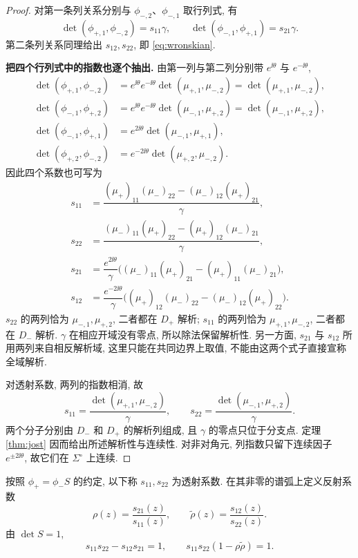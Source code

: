\begin{proof}
对第一条列关系分别与 $\phi_{-,2}$、$\phi_{-,1}$ 取行列式, 有
\[
\det(\phi_{+,1},\phi_{-,2})=s_{11}\gamma,\qquad
\det(\phi_{-,1},\phi_{+,1})=s_{21}\gamma.
\]
第二条列关系同理给出 $s_{12},s_{22}$, 即 \eqref{eq:wronskian}. 
\par\medskip\noindent\textbf{把四个行列式中的指数也逐个抽出.}\quad 
由第一列与第二列分别带 $e^{\ii\theta}$ 与 $e^{-\ii\theta}$,
\begin{align*}
\det(\phi_{+,1},\phi_{-,2})
&=e^{\ii\theta}e^{-\ii\theta}
\det(\mu_{+,1},\mu_{-,2})
=\det(\mu_{+,1},\mu_{-,2}),\\
\det(\phi_{-,1},\phi_{+,2})
&=e^{\ii\theta}e^{-\ii\theta}
\det(\mu_{-,1},\mu_{+,2})
=\det(\mu_{-,1},\mu_{+,2}),\\
\det(\phi_{-,1},\phi_{+,1})
&=e^{2\ii\theta}\det(\mu_{-,1},\mu_{+,1}),\\
\det(\phi_{+,2},\phi_{-,2})
&=e^{-2\ii\theta}\det(\mu_{+,2},\mu_{-,2}).
\end{align*}
因此四个系数也可写为
\begin{align*}
s_{11}&=\dfrac{(\mu_+)_{11}(\mu_-)_{22}
-(\mu_-)_{12}(\mu_+)_{21}}{\gamma},\\
s_{22}&=\dfrac{(\mu_-)_{11}(\mu_+)_{22}
-(\mu_+)_{12}(\mu_-)_{21}}{\gamma},\\
s_{21}&=\dfrac{e^{2\ii\theta}}{\gamma}
\bigl((\mu_-)_{11}(\mu_+)_{21}
-(\mu_+)_{11}(\mu_-)_{21}\bigr),\\
s_{12}&=\dfrac{e^{-2\ii\theta}}{\gamma}
\bigl((\mu_+)_{12}(\mu_-)_{22}
-(\mu_-)_{12}(\mu_+)_{22}\bigr).
\end{align*}
$s_{22}$ 的两列恰为 $\mu_{-,1},\mu_{+,2}$,
二者都在 $D_+$ 解析; $s_{11}$ 的两列恰为
$\mu_{+,1},\mu_{-,2}$, 二者都在 $D_-$ 解析.
$\gamma$ 在相应开域没有零点, 所以除法保留解析性.
另一方面, $s_{21}$ 与 $s_{12}$ 所用两列来自相反解析域,
这里只能在共同边界上取值, 不能由这两个式子直接宣称全域解析.

对透射系数, 两列的指数相消, 故
\[
s_{11}=\dfrac{\det(\mu_{+,1},\mu_{-,2})}{\gamma},\qquad
s_{22}=\dfrac{\det(\mu_{-,1},\mu_{+,2})}{\gamma}.
\]
两个分子分别由 $D_-$ 和 $D_+$ 的解析列组成, 且 $\gamma$ 的零点只位于分支点. 定理 \ref{thm:jost} 因而给出所述解析性与连续性. 对非对角元, 列指数只留下连续因子 $e^{\pm2\ii\theta}$, 故它们在 $\Sigma^\circ$ 上连续.
\end{proof}

按照 $\phi_+=\phi_-S$ 的约定, 以下称 $s_{11},s_{22}$ 为透射系数. 在其非零的谱弧上定义反射系数
\begin{equation}\label{eq:reflection}
\rho(z)=\dfrac{s_{21}(z)}{s_{11}(z)},\qquad
\widetilde\rho(z)=\dfrac{s_{12}(z)}{s_{22}(z)}.
\end{equation}
由 $\det S=1$,
\begin{equation}\label{eq:scattering-determinant}
s_{11}s_{22}-s_{12}s_{21}=1,\qquad
s_{11}s_{22}(1-\rho\widetilde\rho)=1.
\end{equation}


